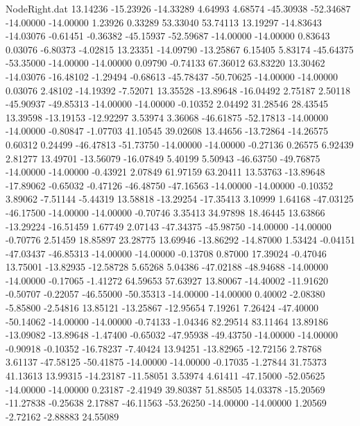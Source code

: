 \begin{filecontents}{NodeRight.dat}
  13.14236  -15.23926  -14.33289     4.64993    4.68574  -45.30938  -52.34687  -14.00000  -14.00000    1.23926    0.33289   53.33040   53.74113
  13.19297  -14.83643  -14.03076    -0.61451   -0.36382  -45.15937  -52.59687  -14.00000  -14.00000    0.83643    0.03076   -6.80373   -4.02815
  13.23351  -14.09790  -13.25867     6.15405    5.83174  -45.64375  -53.35000  -14.00000  -14.00000    0.09790   -0.74133   67.36012   63.83220
  13.30462  -14.03076  -16.48102    -1.29494   -0.68613  -45.78437  -50.70625  -14.00000  -14.00000    0.03076    2.48102  -14.19392   -7.52071
  13.35528  -13.89648  -16.04492     2.75187    2.50118  -45.90937  -49.85313  -14.00000  -14.00000   -0.10352    2.04492   31.28546   28.43545
  13.39598  -13.19153  -12.92297     3.53974    3.36068  -46.61875  -52.17813  -14.00000  -14.00000   -0.80847   -1.07703   41.10545   39.02608
  13.44656  -13.72864  -14.26575     0.60312    0.24499  -46.47813  -51.73750  -14.00000  -14.00000   -0.27136    0.26575    6.92439    2.81277
  13.49701  -13.56079  -16.07849     5.40199    5.50943  -46.63750  -49.76875  -14.00000  -14.00000   -0.43921    2.07849   61.97159   63.20411
  13.53763  -13.89648  -17.89062    -0.65032   -0.47126  -46.48750  -47.16563  -14.00000  -14.00000   -0.10352    3.89062   -7.51144   -5.44319
  13.58818  -13.29254  -17.35413     3.10999    1.64168  -47.03125  -46.17500  -14.00000  -14.00000   -0.70746    3.35413   34.97898   18.46445
  13.63866  -13.29224  -16.51459     1.67749    2.07143  -47.34375  -45.98750  -14.00000  -14.00000   -0.70776    2.51459   18.85897   23.28775
  13.69946  -13.86292  -14.87000     1.53424   -0.04151  -47.03437  -46.85313  -14.00000  -14.00000   -0.13708    0.87000   17.39024   -0.47046
  13.75001  -13.82935  -12.58728     5.65268    5.04386  -47.02188  -48.94688  -14.00000  -14.00000   -0.17065   -1.41272   64.59653   57.63927
  13.80067  -14.40002  -11.91620    -0.50707   -0.22057  -46.55000  -50.35313  -14.00000  -14.00000    0.40002   -2.08380   -5.85800   -2.54816
  13.85121  -13.25867  -12.95654     7.19261    7.26424  -47.40000  -50.14062  -14.00000  -14.00000   -0.74133   -1.04346   82.29514   83.11464
  13.89186  -13.09082  -13.89648    -1.47400   -0.65032  -47.95938  -49.43750  -14.00000  -14.00000   -0.90918   -0.10352  -16.78237   -7.40424
  13.94251  -13.82965  -12.72156     2.78768    3.61137  -47.58125  -50.41875  -14.00000  -14.00000   -0.17035   -1.27844   31.75373   41.13613
  13.99315  -14.23187  -11.58051     3.53974    4.61411  -47.15000  -52.05625  -14.00000  -14.00000    0.23187   -2.41949   39.80387   51.88505
  14.03378  -15.20569  -11.27838    -0.25638    2.17887  -46.11563  -53.26250  -14.00000  -14.00000    1.20569   -2.72162   -2.88883   24.55089

\end{filecontents}
